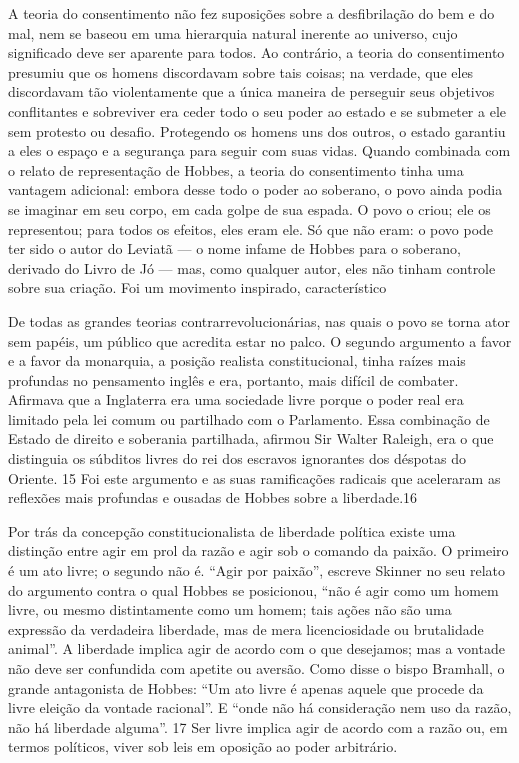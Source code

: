 \par 
A teoria do consentimento não fez suposições sobre a desfibrilação do bem e do mal, nem se baseou em uma hierarquia natural inerente ao universo, cujo significado deve ser aparente para todos. Ao contrário, a teoria do consentimento presumiu que os homens discordavam sobre tais coisas; na verdade, que eles discordavam tão violentamente que a única maneira de perseguir seus objetivos conflitantes e sobreviver era ceder todo o seu poder ao estado e se submeter a ele sem protesto ou desafio. Protegendo os homens uns dos outros, o estado garantiu a eles o espaço e a segurança para seguir com suas vidas. Quando combinada com o relato de representação de Hobbes, a teoria do consentimento tinha uma vantagem adicional: embora desse todo o poder ao soberano, o povo ainda podia se imaginar em seu corpo, em cada golpe de sua espada. O povo o criou; ele os representou; para todos os efeitos, eles eram ele. Só que não eram: o povo pode ter sido o autor do Leviatã — o nome infame de Hobbes para o soberano, derivado do Livro de Jó — mas, como qualquer autor, eles não tinham controle sobre sua criação. Foi um movimento inspirado, característico
 \par 
De todas as grandes teorias contrarrevolucionárias, nas quais o povo se torna ator sem papéis, um público que acredita estar no palco. O segundo argumento a favor e a favor da monarquia, a posição realista constitucional, tinha raízes mais profundas no pensamento inglês e era, portanto, mais difícil de combater. Afirmava que a Inglaterra era uma sociedade livre porque o poder real era limitado pela lei comum ou partilhado com o Parlamento. Essa combinação de Estado de direito e soberania partilhada, afirmou Sir Walter Raleigh, era o que distinguia os súbditos livres do rei dos escravos ignorantes dos déspotas do Oriente. {\color{blue}15} Foi este argumento e as suas ramificações radicais que aceleraram as reflexões mais profundas e ousadas de Hobbes sobre a liberdade.{\color{blue}16}
 \par 
Por trás da concepção constitucionalista de liberdade política existe uma distinção entre agir em prol da razão e agir sob o comando da paixão. O primeiro é um ato livre; o segundo não é. “Agir por paixão”, escreve Skinner no seu relato do argumento contra o qual Hobbes se posicionou, “não é agir como um homem livre, ou mesmo distintamente como um homem; tais ações não são uma expressão da verdadeira liberdade, mas de mera licenciosidade ou brutalidade animal”. A liberdade implica agir de acordo com o que desejamos; mas a vontade não deve ser confundida com apetite ou aversão. Como disse o bispo Bramhall, o grande antagonista de Hobbes: “Um ato livre é apenas aquele que procede da livre eleição da vontade racional”. E “onde não há consideração nem uso da razão, não há liberdade alguma”. {\color{blue}17} Ser livre implica agir de acordo com a razão ou, em termos políticos, viver sob leis em oposição ao poder arbitrário.
